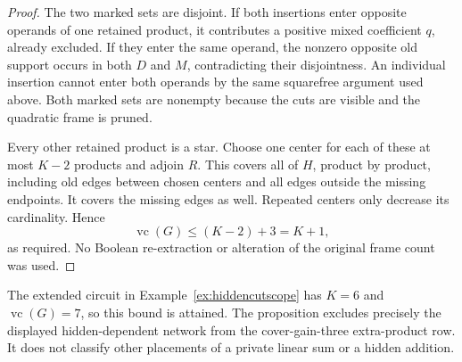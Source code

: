 \documentclass[11pt]{article}
\newcommand{\vc}{\operatorname{vc}}
\theoremstyle{definition}
\theoremstyle{remark}
\begin{document}
\begin{proof}
The two marked sets are disjoint. If both insertions enter opposite operands of one retained product, it contributes a positive mixed coefficient $q$, already excluded. If they enter the same operand, the nonzero opposite old support occurs in both $D$ and $M$, contradicting their disjointness. An individual insertion cannot enter both operands by the same squarefree argument used above. Both marked sets are nonempty because the cuts are visible and the quadratic frame is pruned.

Every other retained product is a star. Choose one center for each of these at most $K-2$ products and adjoin $R$. This covers all of $H$, product by product, including old edges between chosen centers and all edges outside the missing endpoints. It covers the missing edges as well. Repeated centers only decrease its cardinality. Hence
\[
 \vc(G)\le (K-2)+3=K+1,
\]
as required. No Boolean re-extraction or alteration of the original frame count was used.
\end{proof}
The extended circuit in Example~\ref{ex:hiddencutscope} has $K=6$ and $\vc(G)=7$, so this bound is attained. The proposition excludes precisely the displayed hidden-dependent network from the cover-gain-three extra-product row. It does not classify other placements of a private linear sum or a hidden addition.
\end{document}

